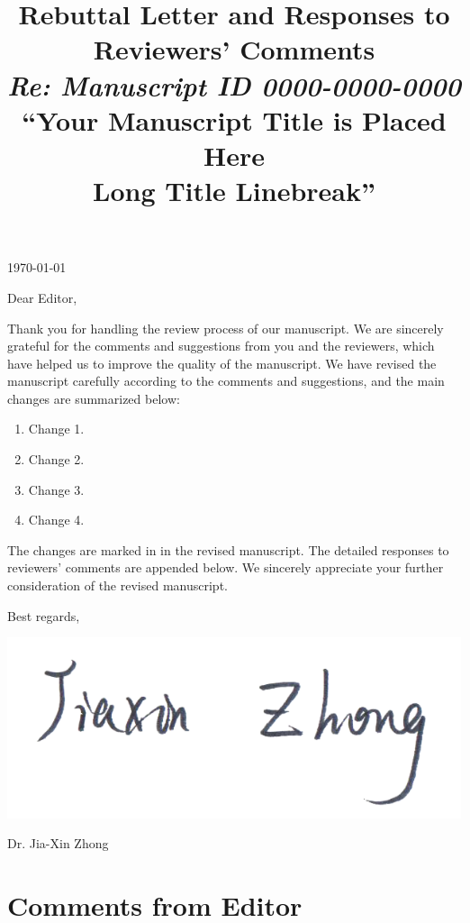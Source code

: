 \documentclass{RebuttalLetter}
\title{
    \vspace{2em}
    \textbf{\Large Rebuttal Letter and Responses to Reviewers' Comments}
    \\[-.5em]
    \textit{\large Re: Manuscript ID 0000-0000-0000}
    \\[-.8em]
    {\normalsize \textbf{ ``Your Manuscript Title is Placed Here}} \\[-16pt]
    {\normalsize  \textbf{ Long Title Linebreak''}}
    \vspace{-4em}
}
\begin{document}
\date{}
\maketitle

\thispagestyle{firststyle}

\noindent
\today

\noindent
Dear Editor,

Thank you for handling the review process of our manuscript.
We are sincerely grateful for the comments and suggestions from you and the reviewers, which have helped us
to improve the quality of the manuscript. We have revised the manuscript carefully according to
the comments and suggestions, and the main changes are summarized below:
\begin{enumerate}
    \item Change 1.
    \item Change 2.
    \item Change 3.
    \item Change 4.
\end{enumerate}

The changes are marked in  in the revised manuscript.
The detailed responses to reviewers' comments are appended below.
We sincerely appreciate your further consideration of the revised manuscript.


\lipsum[1-4]

Best regards,

\includegraphics[scale=0.8]{img/Signature-EN1-20181030.png}
\vspace{-1em}

Dr. Jia-Xin Zhong

\newpage
\section{Comments from Editor}
\begin{commentbox}
    \lipsum[1]
\end{commentbox}
\end{document}
